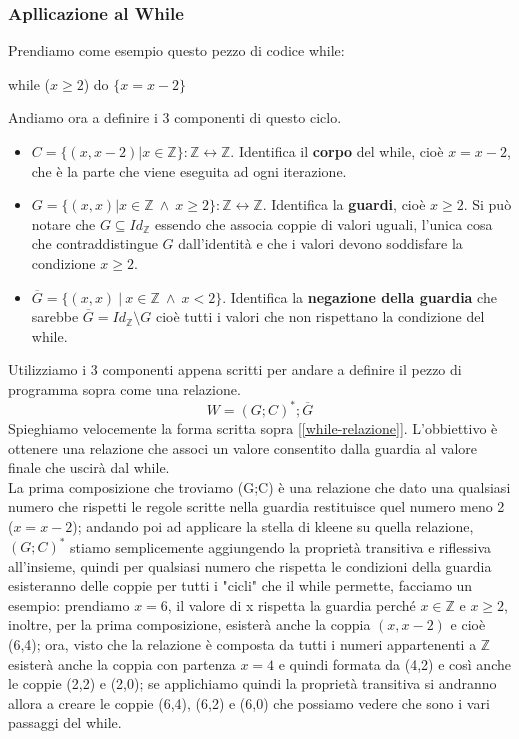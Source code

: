 \subsubsection{Apllicazione al While}
Prendiamo come esempio questo pezzo di codice while:
\begin{center}
    while ($x \geq 2$) do $\{x = x - 2\}$
\end{center}
Andiamo ora a definire i 3 componenti di questo ciclo.
\begin{itemize}
    \item $C = \{(x, x-2) | x \in \mathbb{Z}\}: \mathbb{Z} \longleftrightarrow \mathbb{Z}$.
    Identifica il \textbf{corpo} del while, cioè $x = x - 2$, che è la parte che viene eseguita ad ogni iterazione.
    \item $G = \{(x,x) | x \in \mathbb{Z} \: \land \: x \geq 2\}: \mathbb{Z} \longleftrightarrow \mathbb{Z}$. Identifica la \textbf{guardi}, cioè $x \geq 2$. Si può notare che $G \subseteq Id_{\mathbb{Z}}$ essendo che associa coppie di valori uguali, l'unica cosa che contraddistingue $G$ dall'identità e che i valori devono soddisfare la condizione $x \geq 2$.
    \item $\overline{G} = \{(x,x)\:|\:x \in \mathbb{Z} \: \land \: x < 2\}$.
    Identifica la \textbf{negazione della guardia} che sarebbe $\overline{G} = Id_{\mathbb{Z}} \setminus G$ cioè tutti i valori che non rispettano la condizione del while.
\end{itemize}
Utilizziamo i 3 componenti appena scritti per andare a definire il pezzo di programma sopra come una relazione.
\begin{equation}\label{while-relazione}
    W = (G;C)^*;\overline{G}
\end{equation}
Spieghiamo velocemente la forma scritta sopra [\ref{while-relazione}]. L'obbiettivo è ottenere una relazione che associ un valore consentito dalla guardia al valore finale che uscirà dal while.\\
La prima composizione che troviamo (G;C) è una relazione che dato una qualsiasi numero che rispetti le regole scritte nella guardia restituisce quel numero meno 2 ($x = x - 2$); andando poi ad applicare la stella di kleene su quella relazione, $(G;C)^*$ stiamo semplicemente aggiungendo la proprietà transitiva e riflessiva all'insieme, quindi per qualsiasi numero che rispetta le condizioni della guardia esisteranno delle coppie per tutti i "cicli" che il while permette, facciamo un esempio: prendiamo $x = 6$, il valore di x rispetta la guardia perché $x \in \mathbb{Z}$ e $x \geq 2$, inoltre, per la prima composizione, esisterà anche la coppia $(x, x-2)$ e cioè (6,4); ora, visto che la relazione è composta da tutti i numeri appartenenti a $\mathbb{Z}$ esisterà anche la coppia con partenza $x = 4$ e quindi formata da (4,2) e così anche le coppie (2,2) e (2,0); se applichiamo quindi la proprietà transitiva si andranno allora a creare le coppie (6,4), (6,2) e (6,0) che possiamo vedere che sono i vari passaggi del while.\\
